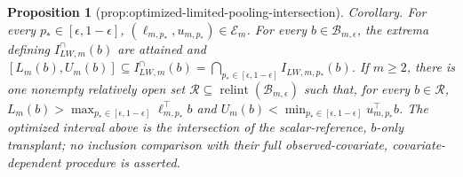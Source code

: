 \documentclass{article}
\newtheorem{proposition}{Proposition}
\begin{document}
\begin{proposition}[prop:optimized-limited-pooling-intersection]\label{prop:optimized-limited-pooling-intersection}
Corollary. For every \(p_*\in[\epsilon,1-\epsilon]\), \((\ell_{m,p_*},u_{m,p_*})\in\mathcal E_m\). For every \(b\in\mathcal B_{m,\epsilon}\), the extrema defining \(I_{LW,m}^{\cap}(b)\) are attained and \([L_m(b),U_m(b)]\subseteq I_{LW,m}^{\cap}(b)=\bigcap_{p_*\in[\epsilon,1-\epsilon]}I_{LW,m,p_*}(b)\). If \(m\ge2\), there is one nonempty relatively open set \(\mathcal R\subseteq\operatorname{relint}(\mathcal B_{m,\epsilon})\) such that, for every \(b\in\mathcal R\), \(L_m(b)>\max_{p_*\in[\epsilon,1-\epsilon]}\ell_{m,p_*}^{\top}b\) and \(U_m(b)<\min_{p_*\in[\epsilon,1-\epsilon]}u_{m,p_*}^{\top}b\). The optimized interval above is the intersection of the scalar-reference, \(b\)-only transplant; no inclusion comparison with their full observed-covariate, covariate-dependent procedure is asserted.
\end{proposition}
\end{document}
